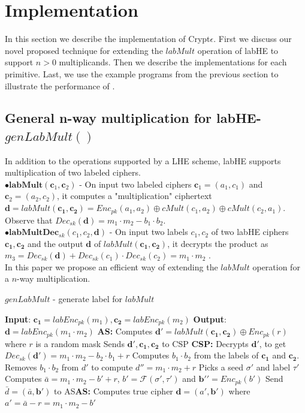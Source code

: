 \section{Implementation}\label{sec:implementaion}
\label{implementation}
In this section we describe the implementation of Crypt$\epsilon$. First we discuss our novel proposed technique for extending the $labMult$ operation of \textsf{labHE} to support $n > 0$ multiplicands. Then we describe the implementations for each primitive. Last, we use the example programs from the previous section to illustrate the performance of \system.

\subsection{\textbf{General n-way multiplication for \textsf{labHE}- $genLabMult()$}}\label{genlab}
In addition to the operations supported by a \textsf{LHE}  scheme, \textsf{labHE} supports multiplication of two labeled ciphers. 
\\ $\bullet \textbf{labMult}(\mathbf{c}_1,\mathbf{c}_2)$ -
On input two labeled ciphers $\mathbf{c}_1=(a_1,c_1)$ and $\mathbf{c}_2=(a_2,c_2)$, it computes a "multiplication" ciphertext $\mathbf{d}=labMult(\mathbf{c_1,c_2})=Enc_{pk}(a_1,a_2)\oplus cMult(c_1,a_2) \oplus cMult(c_2,a_1)$. Observe that $Dec_{sk}(\mathbf{d})=m_1\cdot m_2 -b_1 \cdot b_2$.\\
 $\bullet \textbf{labMultDec}_{sk}(c_1,c_2,\mathbf{d})$ - On input two labels $c_1,c_2$ of two labHE ciphers $\mathbf{c_1},\mathbf{c_2}$ and the output $\mathbf{d}$ of $labMult(\mathbf{c_1},\mathbf{c_2})$, it decrypts the product as $m_3=Dec_{sk}(\mathbf{d})+Dec_{sk}(c_1)\cdot Dec_{sk}(c_2) = m_1\cdot m_2$ .   \\
In this paper we propose an efficient way of extending the $labMult$ operation for a $n$-way multiplication.
\begin{algorithm}
\caption{$genLabMult$ - generate label for $labMult$}
\begin{algorithmic}[1]
\STATEx
\textbf{Input}: $\mathbf{c_1}=labEnc_{pk}(m_1),\mathbf{c_2}=labEnc_{pk}(m_2)$
\STATEx \textbf{Output}: $\mathbf{d}=labEnc_{pk}(m_1\cdot m_2)$
\STATEx \textbf{\textsf{AS}:} \STATE Computes $\textbf{d}'=labMult(\mathbf{c_1,c_2}) \oplus Enc_{pk}(r)$ where $r$ is a random mask \STATE Sends $\mathbf{d'},\mathbf{c_1},\mathbf{c_2}$ to \textsf{CSP}
\STATEx \textbf{\textsf{CSP}:}
\STATE Decrypts $\mathbf{d'}$, to get $Dec_{sk}(\mathbf{d}')=m_1\cdot m_2 -b_2\cdot b_1 + r$
\STATE Computes $b_1 \cdot b_2$ from the labels of $\mathbf{c_1}$ and $\mathbf{c_2}$.
\STATE Removes $b_1\cdot b_2$ from $d'$ to compute $d''=m_1\cdot m_2+r$
\STATE Picks a seed $\sigma'$ and label $\tau'$
\STATE Computes $\bar{a}=m_1\cdot m_2 -b' +r$, $b'=\mathcal{F}(\sigma',\tau')$ and $\mathbf{b'}'=Enc_{pk}(b')$
\STATE Send $\bar{d}=(\bar{a},\mathbf{b'})$ to \textsf{AS}\STATEx \textbf{\textsf{AS}:}
\STATE Computes true cipher $\mathbf{d}=(a',\mathbf{b}')$ where $a'=\bar{a}-r=m_1\cdot m_2 - b'$
 \end{algorithmic}
\end{algorithm}
